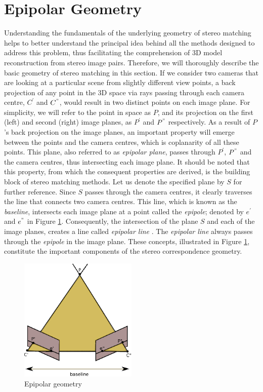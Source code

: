 \section{Epipolar Geometry}
Understanding the fundamentals of the underlying geometry of stereo matching helps to better understand the principal idea behind all the methods designed to address this problem, 
thus facilitating the comprehension of 3D model reconstruction from stereo image pairs. Therefore, we will thoroughly describe the basic geometry of stereo matching in this section. \newline
If we consider two cameras that are looking at a particular scene from slightly different view points, 
a back projection of any point in the 3D space via rays passing through each camera centre,
${C}^{'}$ and ${C}^{"}$, would result in two distinct points on each image plane. For simplicity, we will refer to the point 
in space as $P$, and its projection on the first (left) and second (right) image planes,
as $P^{'}$ and ${P}^{"}$ respectively. \newline
As a result of $P$'s back projection on the image planes, an important property will emerge between the points and the camera centres, which is coplanarity of all these points. 
This plane, also referred to as {\it epipolar plane}, passes through $P^{'}$, $P^{"}$ and the camera centres, thus intersecting each image plane. 
It should be noted that this property, from which the consequent properties are derived, is the building block of stereo matching methods. 
Let us denote the specified plane by $S$ for further reference. 
Since $S$ passes through the camera centres, it clearly traverses the line 
that connects two camera centres. This line, which is known as the {\it baseline}, intersects each image plane at a point called the {\it epipole}; denoted by ${e}^{'}$ and ${e}^{"}$
in Figure \ref{fig:epg}. 
Consequently, the intersection of the plane $S$ and each of the image planes, creates a line called {\it epipolar line} \cite{hart2000}. 
The {\it epipolar line} always passes through the {\it epipole} in the image plane. 
These concepts, illustrated in Figure \ref{fig:epg}, constitute the important components of the stereo correspondence geometry.

\begin{figure}[H]
\centering
\includegraphics[width=0.5\textwidth]{epipole}
%
\caption{Epipolar geometry}
\label{fig:epg}
\end{figure} 

